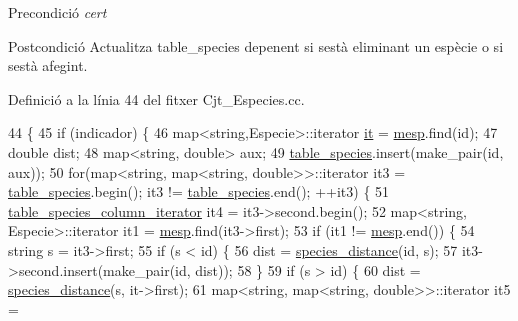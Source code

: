 \begin{DoxyPrecond}{Precondició}
{\itshape cert} 
\end{DoxyPrecond}
\begin{DoxyPostcond}{Postcondició}
Actualitza table\+\_\+species depenent si s\textquotesingle{}està eliminant un espècie o si s\textquotesingle{}està afegint. 
\end{DoxyPostcond}


Definició a la línia 44 del fitxer Cjt\+\_\+\+Especies.\+cc.


\begin{DoxyCode}
44                                                                     \{
45     \textcolor{keywordflow}{if} (indicador) \{
46         map<string,Especie>::iterator \hyperlink{class_cjt___especies_a25b19415a21bdabe9e2fc2ad7d2f68a5}{it} = \hyperlink{class_cjt___especies_a64a525b38c78935e7432b362ea9a2306}{mesp}.find(\textcolor{keywordtype}{id});
47         \textcolor{keywordtype}{double} dist;
48         map<string, double> aux;
49         \hyperlink{class_cjt___especies_ae56d242080836b8d3db505f0a8623090}{table\_species}.insert(make\_pair(\textcolor{keywordtype}{id}, aux));
50         \textcolor{keywordflow}{for}(map<\textcolor{keywordtype}{string}, map<string, double>>::iterator it3 = \hyperlink{class_cjt___especies_ae56d242080836b8d3db505f0a8623090}{table\_species}.begin(); it3 != 
      \hyperlink{class_cjt___especies_ae56d242080836b8d3db505f0a8623090}{table\_species}.end(); ++it3) \{
51             \hyperlink{class_cjt___especies_a11316f4de57c3d78183137abe33b31c5}{table\_species\_column\_iterator} it4 = it3->second.begin();
52             map<string, Especie>::iterator it1 = \hyperlink{class_cjt___especies_a64a525b38c78935e7432b362ea9a2306}{mesp}.find(it3->first);
53             \textcolor{keywordflow}{if} (it1 != \hyperlink{class_cjt___especies_a64a525b38c78935e7432b362ea9a2306}{mesp}.end()) \{
54                 \textcolor{keywordtype}{string} s = it3->first;
55                 \textcolor{keywordflow}{if} (s < \textcolor{keywordtype}{id}) \{
56                     dist = \hyperlink{class_cjt___especies_abf55093b325fd101ef73aa18dd1cf823}{species\_distance}(\textcolor{keywordtype}{id}, s);                        
57                     it3->second.insert(make\_pair(\textcolor{keywordtype}{id}, dist));
58                 \}
59                 \textcolor{keywordflow}{if} (s > \textcolor{keywordtype}{id}) \{
60                     dist = \hyperlink{class_cjt___especies_abf55093b325fd101ef73aa18dd1cf823}{species\_distance}(s, it->first);
61                     map<string, map<string, double>>::iterator it5 = 

\end{DoxyCode}
